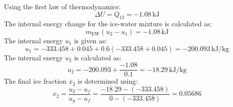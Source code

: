 Using the first law of thermodynamics:  
\[
\Delta U = Q_{12} = -1.08 \, \text{kJ}
\]  
The internal energy change for the ice-water mixture is calculated as:  
\[
m_{\text{EW}} (u_2 - u_1) = -1.08 \, \text{kJ}
\]  
The internal energy \( u_1 \) is given as:  
\[
u_1 = -333.458 + 0.045 + 0.6(-333.458 + 0.045) = -200.093 \, \text{kJ}/\text{kg}
\]  
The internal energy \( u_2 \) is calculated as:  
\[
u_2 = -200.093 + \frac{-1.08}{0.1} = -18.29 \, \text{kJ}/\text{kg}
\]  
The final ice fraction \( x_2 \) is determined using:  
\[
x_2 = \frac{u_2 - u_f}{u_g - u_f} = \frac{-18.29 - (-333.458)}{0 - (-333.458)} = 0.05686
\]
